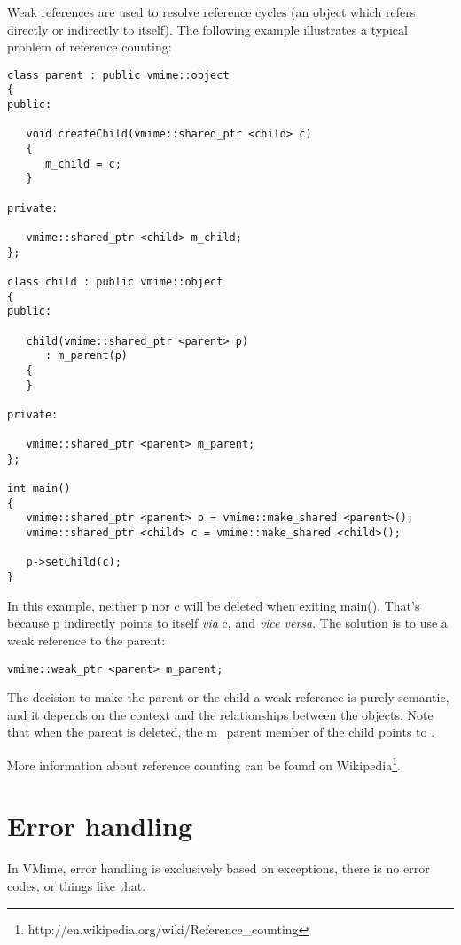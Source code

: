 Weak references are used to resolve reference cycles (an object which refers
directly or indirectly to itself). The following example illustrates a
typical problem of reference counting:

\begin{lstlisting}
class parent : public vmime::object
{
public:

   void createChild(vmime::shared_ptr <child> c)
   {
      m_child = c;
   }

private:

   vmime::shared_ptr <child> m_child;
};

class child : public vmime::object
{
public:

   child(vmime::shared_ptr <parent> p)
      : m_parent(p)
   {
   }

private:

   vmime::shared_ptr <parent> m_parent;
};

int main()
{
   vmime::shared_ptr <parent> p = vmime::make_shared <parent>();
   vmime::shared_ptr <child> c = vmime::make_shared <child>();

   p->setChild(c);
}
\end{lstlisting}

In this example, neither {\vcode p} nor {\vcode c} will be deleted when
exiting {\vcode main()}. That's because {\vcode p} indirectly points to itself
{\em via} {\vcode c}, and {\em vice versa}. The solution is to use a weak
reference to the parent:

\begin{lstlisting}
vmime::weak_ptr <parent> m_parent;
\end{lstlisting}

The decision to make the parent or the child a weak reference is purely
semantic, and it depends on the context and the relationships between the
objects. Note that when the parent is deleted, the {\vcode m\_parent} member
of the child points to \vnull.

More information about reference counting can be found on
Wikipedia\footnote{http://en.wikipedia.org/wiki/Reference\_counting}.

\section{Error handling}

In VMime, error handling is exclusively based on exceptions, there is no error
codes, or things like that.

